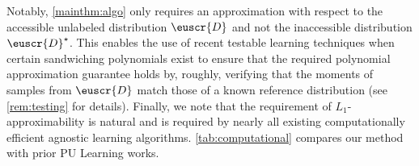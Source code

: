 \documentclass[11pt]{article}
\theoremstyle{plain}
\theoremstyle{definition}
\theoremstyle{remark}
\newcommand{\customcal}[1]{\euscr{#1}}
\newcommand{\cD}{\customcal{D}}
\newcommand{\cDtrue}{\cD^\star}
\newcommand{\cDgiven}{\cD}
\newcommand{\nL}{L}
\begin{document}
        Notably, \cref{mainthm:algo} only requires an approximation with respect to the accessible unlabeled distribution $\cDgiven$ and not the inaccessible distribution $\cDtrue$.
        This enables the use of recent testable learning techniques when certain sandwiching polynomials exist \cite{rubinfeld2023testing,gollakota2023momentMatching,gollakota2023universal} to ensure that the required polynomial approximation guarantee holds by, roughly, verifying that the moments of samples from $\cDgiven$ match those of a known reference distribution (see \cref{rem:testing} for details). 
        Finally, we note that the requirement of $\nL_1$-approximability is natural and is required by nearly all existing computationally efficient agnostic learning algorithms.
        \cref{tab:computational}
        compares our method with prior PU Learning works.
        
        
\end{document}
